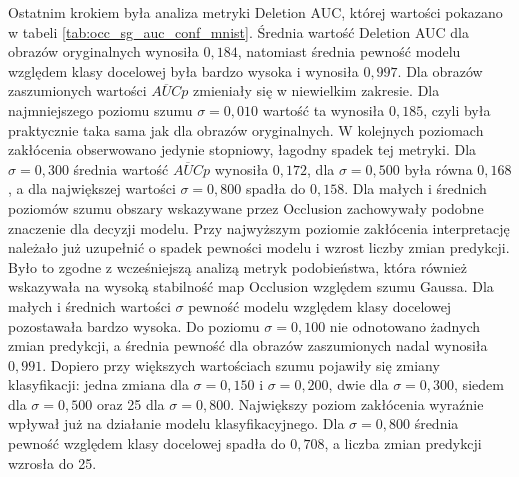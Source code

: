 Ostatnim krokiem była analiza metryki Deletion AUC, której wartości pokazano w tabeli \ref{tab:occ_sg_auc_conf_mnist}. Średnia wartość Deletion AUC dla obrazów oryginalnych wynosiła $0{,}184$, natomiast średnia pewność modelu względem klasy docelowej była bardzo wysoka i wynosiła $0{,}997$. Dla obrazów zaszumionych wartości $\overline{AUC}{p}$ zmieniały się w niewielkim zakresie. Dla najmniejszego poziomu szumu $\sigma = 0{,}010$ wartość ta wynosiła $0{,}185$, czyli była praktycznie taka sama jak dla obrazów oryginalnych. W kolejnych poziomach zakłócenia obserwowano jedynie stopniowy, łagodny spadek tej metryki. Dla $\sigma = 0{,}300$ średnia wartość $\overline{AUC}{p}$ wynosiła $0{,}172$, dla $\sigma = 0{,}500$ była równa $0{,}168$, a dla największej wartości $\sigma = 0{,}800$ spadła do $0{,}158$. Dla małych i średnich poziomów szumu obszary wskazywane przez Occlusion zachowywały podobne znaczenie dla decyzji modelu. Przy najwyższym poziomie zakłócenia interpretację należało już uzupełnić o spadek pewności modelu i wzrost liczby zmian predykcji. Było to zgodne z wcześniejszą analizą metryk podobieństwa, która również wskazywała na wysoką stabilność map Occlusion względem szumu Gaussa. Dla małych i średnich wartości $\sigma$ pewność modelu względem klasy docelowej pozostawała bardzo wysoka. Do poziomu $\sigma = 0{,}100$ nie odnotowano żadnych zmian predykcji, a średnia pewność dla obrazów zaszumionych nadal wynosiła $0{,}991$. Dopiero przy większych wartościach szumu pojawiły się zmiany klasyfikacji: jedna zmiana dla $\sigma = 0{,}150$ i $\sigma = 0{,}200$, dwie dla $\sigma = 0{,}300$, siedem dla $\sigma = 0{,}500$ oraz 25 dla $\sigma = 0{,}800$. Największy poziom zakłócenia wyraźnie wpływał już na działanie modelu klasyfikacyjnego. Dla $\sigma = 0{,}800$ średnia pewność względem klasy docelowej spadła do $0{,}708$, a liczba zmian predykcji wzrosła do 25.

